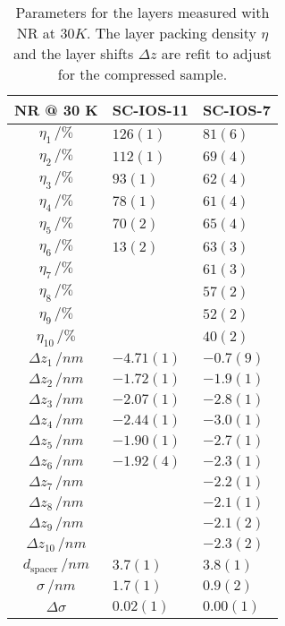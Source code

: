 \documentclass[\main/dresen_thesis.tex]{subfiles}
\begin{document}
  \begin{table}[!htbp]
    \centering
    \caption{\label{tab:looselyPackedNP:layers:reflectivity30K}Parameters for the layers measured with NR at $30 \unit{K}$. The layer packing density $\eta$ and the layer shifts $\Delta z$ are refit to adjust for the compressed sample.}
    \begin{tabular}{ c | l | l}
      \rule{0pt}{2ex} \textbf{NR @ 30 K}  & \textbf{SC-IOS-11} & \textbf{SC-IOS-7} \\
      \hline
       $\eta_1     \, / \unit{\%}$      & $126(1)$  & $81(6)$\\
       $\eta_2     \, / \unit{\%}$      & $112(1)$  & $69(4)$\\
       $\eta_3     \, / \unit{\%}$      & $93(1)$   & $62(4)$\\
       $\eta_4     \, / \unit{\%}$      & $78(1)$   & $61(4)$\\
       $\eta_5     \, / \unit{\%}$      & $70(2)$   & $65(4)$\\
       $\eta_6     \, / \unit{\%}$      & $13(2)$   & $63(3)$\\
       $\eta_7     \, / \unit{\%}$      &           & $61(3)$\\
       $\eta_8     \, / \unit{\%}$      &           & $57(2)$\\
       $\eta_9     \, / \unit{\%}$      &           & $52(2)$\\
       $\eta_{10}     \, / \unit{\%}$   &           & $40(2)$\\
       \hline
       $\Delta z_1 \, / \unit{nm} $     & $-4.71(1)$ & $-0.7(9)$\\
       $\Delta z_2 \, / \unit{nm} $     & $-1.72(1)$ & $-1.9(1)$\\
       $\Delta z_3 \, / \unit{nm} $     & $-2.07(1)$ & $-2.8(1)$\\
       $\Delta z_4 \, / \unit{nm} $     & $-2.44(1)$ & $-3.0(1)$\\
       $\Delta z_5 \, / \unit{nm} $     & $-1.90(1)$ & $-2.7(1)$\\
       $\Delta z_6 \, / \unit{nm} $     & $-1.92(4)$ & $-2.3(1)$\\
       $\Delta z_7 \, / \unit{nm} $     &            & $-2.2(1)$\\
       $\Delta z_8 \, / \unit{nm} $     &            & $-2.1(1)$\\
       $\Delta z_9 \, / \unit{nm} $     &            & $-2.1(2)$\\
       $\Delta z_{10} \, / \unit{nm} $  &            & $-2.3(2)$\\
       \hline
       $d_\mathrm{spacer}   \, / \unit{nm} $ & $3.7(1)$  & $3.8(1)$\\
       $\sigma     \, / \unit{nm} $          & $1.7(1)$  & $0.9(2)$\\
       $\Delta \sigma$                       & $0.02(1)$ & $0.00(1)$\\
       \hline
    \end{tabular}
  \end{table}
\end{document}
